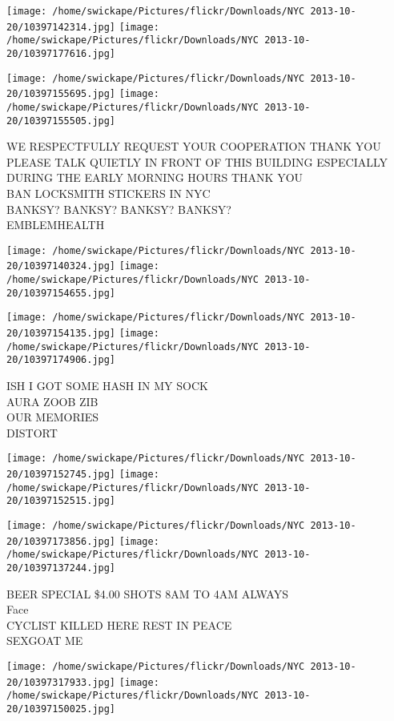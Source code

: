 \documentclass[10pt,letterpaper]{article}
\begin{document}
\texttt{[image: /home/swickape/Pictures/flickr/Downloads/NYC 2013-10-20/10397142314.jpg]}
\texttt{[image: /home/swickape/Pictures/flickr/Downloads/NYC 2013-10-20/10397177616.jpg]}

\texttt{[image: /home/swickape/Pictures/flickr/Downloads/NYC 2013-10-20/10397155695.jpg]}
\texttt{[image: /home/swickape/Pictures/flickr/Downloads/NYC 2013-10-20/10397155505.jpg]}

WE RESPECTFULLY REQUEST YOUR COOPERATION THANK YOU PLEASE TALK QUIETLY IN FRONT OF THIS BUILDING ESPECIALLY DURING THE EARLY MORNING HOURS THANK YOU\\
BAN LOCKSMITH STICKERS IN NYC\\
BANKSY? BANKSY? BANKSY? BANKSY?\\
EMBLEMHEALTH
\pagebreak

\texttt{[image: /home/swickape/Pictures/flickr/Downloads/NYC 2013-10-20/10397140324.jpg]}
\texttt{[image: /home/swickape/Pictures/flickr/Downloads/NYC 2013-10-20/10397154655.jpg]}

\texttt{[image: /home/swickape/Pictures/flickr/Downloads/NYC 2013-10-20/10397154135.jpg]}
\texttt{[image: /home/swickape/Pictures/flickr/Downloads/NYC 2013-10-20/10397174906.jpg]}

ISH I GOT SOME HASH IN MY SOCK\\
AURA ZOOB ZIB\\
OUR MEMORIES\\
DISTORT
\pagebreak

\texttt{[image: /home/swickape/Pictures/flickr/Downloads/NYC 2013-10-20/10397152745.jpg]}
\texttt{[image: /home/swickape/Pictures/flickr/Downloads/NYC 2013-10-20/10397152515.jpg]}

\texttt{[image: /home/swickape/Pictures/flickr/Downloads/NYC 2013-10-20/10397173856.jpg]}
\texttt{[image: /home/swickape/Pictures/flickr/Downloads/NYC 2013-10-20/10397137244.jpg]}

BEER SPECIAL \$4.00 SHOTS 8AM TO 4AM ALWAYS\\
Face\\
CYCLIST KILLED HERE REST IN PEACE\\
SEXGOAT ME
\pagebreak

\texttt{[image: /home/swickape/Pictures/flickr/Downloads/NYC 2013-10-20/10397317933.jpg]}
\texttt{[image: /home/swickape/Pictures/flickr/Downloads/NYC 2013-10-20/10397150025.jpg]}
\end{document}
